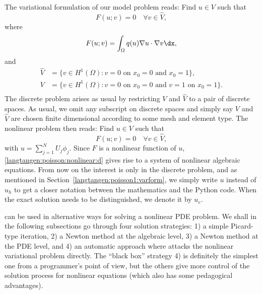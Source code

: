 The variational formulation of our model problem reads:
Find $u \in V$ such that
\begin{equation} \label{langtangen:poisson:nonlinear1}
  F(u; v) = 0 \quad \forall v \in \hat{V},
\end{equation}
where
\begin{equation}
\label{langtangen:poisson:nonlinear2}
F(u; v) = \int_\Omega q(u)\nabla u\cdot \nabla v\dx,
\end{equation}
and
\begin{displaymath}
  \begin{split}
    \hat{V} &= \{v \in H^1(\Omega) : v = 0 \mbox{ on } x_0=0\mbox{ and }x_0=1\}, \\
     V      &= \{v \in H^1(\Omega) : v = 0 \mbox{ on } x_0=0\mbox{ and } v = 1\mbox{ on }x_0=1\}. \\
  \end{split}
\end{displaymath}
The discrete problem arises as usual by restricting $V$ and $\hat V$ to a
pair of discrete spaces. As usual, we omit any subscript on discrete
spaces and simply say $V$ and $\hat V$ are chosen finite dimensional
according to some mesh and element type. 
The nonlinear problem then reads: Find $u\in V$ such that
\begin{equation}
  F(u; v) = 0 \quad \forall v \in \hat{V},
\label{langtangen:poisson:nonlinear:d}
\end{equation}
with $u = \sum_{j=1}^N U_j \phi_j$. Since $F$ is a nonlinear function
of $u$, \eqref{langtangen:poisson:nonlinear:d} gives rise to a system of
nonlinear algebraic equations.
From now on the interest is only in the discrete problem, and as mentioned
in Section~\ref{langtangen:poisson1:varform}, 
we simply write $u$ instead of $u_h$ to get a closer notation between
the mathematics and the Python code. When the exact solution needs to
be distinguished, we denote it by $u_e$.

\fenics{} can be used in alternative ways for solving a nonlinear PDE
problem. We shall in the following subsections go through four
solution strategies: 
1) a simple Picard-type iteration, 
2) a Newton method at the algebraic level, 
3) a Newton method at the PDE level, and 
4) an automatic approach where \fenics{} attacks the nonlinear variational
problem directly. The ``black box'' strategy 4) is definitely the 
simplest one from a
programmer's point of view, but the others give more control of the
solution process for nonlinear equations (which also has some
pedagogical advantages).

